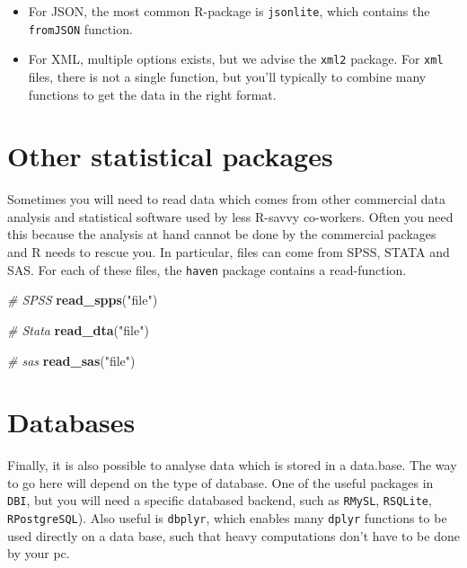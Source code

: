 \documentclass[]{tufte-book}
\newenvironment{Shaded}{}{}
\newcommand{\KeywordTok}[1]{\textcolor[rgb]{0.00,0.44,0.13}{\textbf{#1}}}
\newcommand{\StringTok}[1]{\textcolor[rgb]{0.25,0.44,0.63}{#1}}
\newcommand{\CommentTok}[1]{\textcolor[rgb]{0.38,0.63,0.69}{\textit{#1}}}
\newcommand{\NormalTok}[1]{#1}
\providecommand{\tightlist}{%
  \setlength{\itemsep}{0pt}\setlength{\parskip}{0pt}}
\begin{document}
\begin{itemize}
\tightlist
\item
  For JSON, the most common R-package is \texttt{jsonlite}, which
  contains the \texttt{fromJSON} function.
\item
  For XML, multiple options exists, but we advise the \texttt{xml2}
  package. For \texttt{xml} files, there is not a single function, but
  you'll typically to combine many functions to get the data in the
  right format.
\end{itemize}

\section{Other statistical packages}\label{other-statistical-packages}

Sometimes you will need to read data which comes from other commercial
data analysis and statistical software used by less R-savvy co-workers.
Often you need this because the analysis at hand cannot be done by the
commercial packages and R needs to rescue you. In particular, files can
come from SPSS, STATA and SAS. For each of these files, the
\texttt{haven} package contains a read-function.

\begin{Shaded}
\begin{Highlighting}[]
\CommentTok{# SPSS}
\KeywordTok{read_spps}\NormalTok{(}\StringTok{"file"}\NormalTok{)}

\CommentTok{# Stata}
\KeywordTok{read_dta}\NormalTok{(}\StringTok{"file"}\NormalTok{)}

\CommentTok{# sas}
\KeywordTok{read_sas}\NormalTok{(}\StringTok{"file"}\NormalTok{)}
\end{Highlighting}
\end{Shaded}

\section{Databases}\label{databases}

Finally, it is also possible to analyse data which is stored in a
data.base. The way to go here will depend on the type of database. One
of the useful packages in \texttt{DBI}, but you will need a specific
databased backend, such as \texttt{RMySL}, \texttt{RSQLite},
\texttt{RPostgreSQL}). Also useful is \texttt{dbplyr}, which enables
many \texttt{dplyr} functions to be used directly on a data base, such
that heavy computations don't have to be done by your pc.
\end{document}
